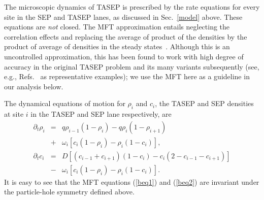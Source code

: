 \documentclass[aps,pre,twocolumn,superscriptaddress,amsmath,amssymb,longbibliography,floatfix]{revtex4}
\begin{document}
The microscopic dynamics of TASEP is prescribed  by the rate equations for every site in the SEP and TASEP lanes, as discussed in Sec.~\ref{model} above. These equations are {\em not} closed. The MFT approximation entails neglecting the correlation effects and replacing the average of product of the densities by the product of average of densities in the steady states~\cite{blythe}. Although this is an uncontrolled approximation, this has been found to work with high degree of accuracy in the original TASEP problem and its many variants subsequently (see, e.g., Refs.~\cite{frey-lktasep,niladri1,tirtha1} as representative examples); we use the MFT here as a guideline in our analysis below.

The dynamical equations of motion for $\rho_i$ and $c_i$, the TASEP and SEP densities at site $i$ in the TASEP and SEP lane respectively, are
\begin{eqnarray}
 \partial_t \rho_i &=& {q}\rho_{i-1}(1-\rho_i) - {q} \rho_i (1-\rho_{i+1}) \nonumber \\&+& \omega_i [ c_i(1-\rho_i)-\rho_i (1-c_i)],\label{beq1}\\
 \partial_t c_i&=& D[(c_{i-1}+c_{i+1})(1-c_i) - c_i(2-c_{i-1}-c_{i+1})] \nonumber \\&-& \omega_i [ c_i(1-\rho_i)-\rho_i (1-c_i)]. \label{beq2}
 \end{eqnarray}
It is easy to see that the MFT equations (\ref{beq1}) and (\ref{beq2}) are invariant under the particle-hole symmetry defined above. 
 
\end{document}
